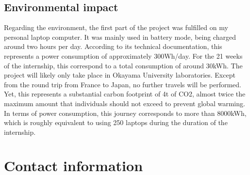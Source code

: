 \documentclass[12pt,a4paper,twoside]{article}
\begin{document}
\subsection{Environmental impact}
Regarding the environment, the first part of the project was fulfilled on my personal laptop computer. It was mainly used in battery mode, being charged around two hours per day. According to its technical documentation, this represents a power consumption of approximately 300Wh/day. For the 21 weeks of the internship, this correspond to a total consumption of around 30kWh.
The project will likely only take place in Okayama University laboratories. Except from the round trip from France to Japan, no further travels will be performed. Yet, this represents a substantial carbon footprint of 4t of CO2, almost twice the maximum amount that individuals should not exceed to prevent global warming. In terms of power consumption, this journey corresponds to more than 8000kWh, which is roughly equivalent to using 250 laptops during the duration of the internship. 

{}


\newpage

\appendix
\section{Contact information}
\end{document}
